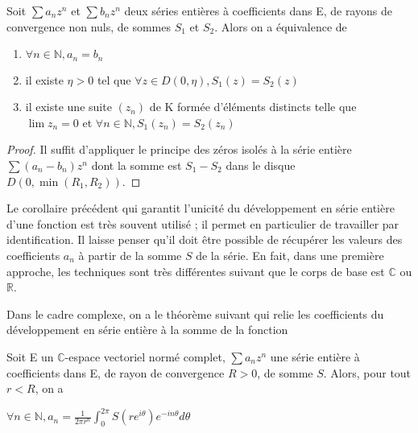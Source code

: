 \begin{thm}
Soit $\sum a_nz^n$ et $\sum b_nz^n$ deux séries entières à coefficients dans E, de rayons de convergence non nuls, de sommes $S_1$ et $S_2$. Alors on a équivalence de
\begin{enumerate}
\item $\forall n \in \mathbb{N}, a_n = b_n$
\item il existe $\eta > 0$ tel que $\forall z \in D(0,\eta), S_1(z) = S_2(z)$
\item il existe une suite $(z_n)$ de K formée d'éléments distincts telle que $\lim z_n = 0$ et $\forall n \in \mathbb{N}, S_1(z_n) = S_2(z_n)$
\end{enumerate}
\end{thm}

\begin{proof}
Il suffit d'appliquer le principe des zéros isolés à la série entière $\sum (a_n - b_n)z^n$ dont la somme est $S_1 - S_2$ dans le disque $D(0,\min(R_1,R_2))$.
\end{proof}

\begin{rem}
Le corollaire précédent qui garantit l'unicité du développement en série entière d'une fonction est très souvent utilisé ; il permet en particulier de travailler par identification. Il laisse penser qu'il doit être possible de récupérer les valeurs des coefficients $a_n$ à partir de la somme $S$ de la série. En fait, dans une première approche, les techniques sont très différentes suivant que le corps de base est $\mathbb{C}$ ou $\mathbb{R}$.
\end{rem}

Dans le cadre complexe, on a le théorème suivant qui relie les coefficients du développement en série entière à la somme de la fonction

\begin{thm}
Soit E un $\mathbb{C}$-espace vectoriel normé complet, $\sum a_nz^n$ une série entière à coefficients dans E, de rayon de convergence $R > 0$, de somme $S$. Alors, pour tout $r < R$, on a

$\forall n \in \mathbb{N}, a_n = \frac{1}{2\pi r^n} \int_0^{2\pi} S(re^{i\theta})e^{-in\theta} d\theta$
\end{thm}

